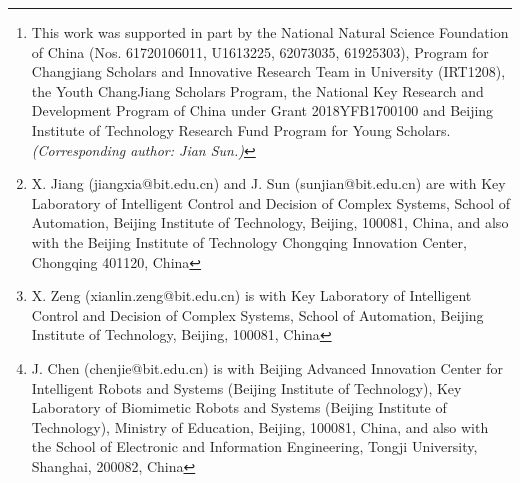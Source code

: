\documentclass[journal]{IEEEtran}
\begin{document}
\author{Xia Jiang,
        Xianlin~Zeng,~
        Jian~Sun,~
        and~Jie~Chen,~%
\thanks{This work was supported in part by the National Natural Science Foundation of China (Nos. 61720106011, U1613225, 62073035, 61925303), Program for Changjiang Scholars and Innovative Research Team in University (IRT1208), the Youth ChangJiang Scholars Program, the National Key Research and Development Program of China under Grant 2018YFB1700100 and Beijing Institute of Technology Research Fund Program for Young Scholars. \emph{(Corresponding author: Jian Sun.)}}
\thanks{X. Jiang (jiangxia@bit.edu.cn) and J. Sun (sunjian@bit.edu.cn) are with Key Laboratory of Intelligent Control and Decision of Complex Systems, School of Automation, Beijing Institute of Technology, Beijing, 100081, China, and also with the Beijing Institute of Technology Chongqing Innovation Center, Chongqing  401120, China}
\thanks{X. Zeng (xianlin.zeng@bit.edu.cn) is with Key Laboratory of Intelligent Control and Decision of Complex Systems, School of Automation, Beijing Institute of Technology, Beijing, 100081, China}
\thanks{J. Chen (chenjie@bit.edu.cn) is with Beijing Advanced Innovation Center for Intelligent Robots and Systems (Beijing Institute of Technology), Key Laboratory of Biomimetic Robots and Systems (Beijing Institute of Technology), Ministry of Education, Beijing, 100081, China, and also with the School of Electronic and Information Engineering, Tongji University, Shanghai, 200082, China}}
%
%
\end{document}
